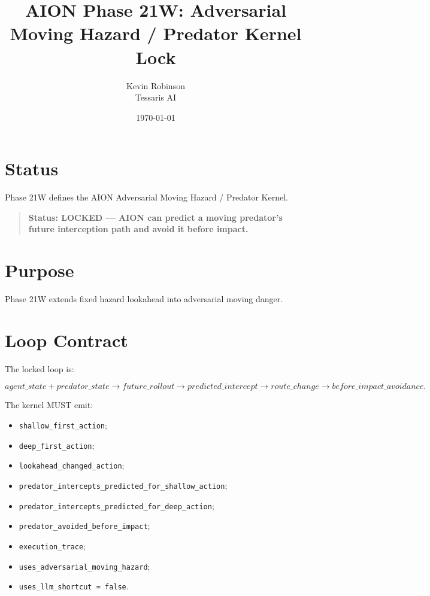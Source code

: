 \documentclass[11pt,a4paper]{article}
\title{\textbf{AION Phase 21W: Adversarial Moving Hazard / Predator Kernel Lock}}
\author{Kevin Robinson\\Tessaris AI}
\date{\today}
\begin{document}
\maketitle

\section{Status}

Phase 21W defines the AION Adversarial Moving Hazard / Predator Kernel.

\begin{quote}
\textbf{Status: LOCKED --- AION can predict a moving predator's future interception path and avoid it before impact.}
\end{quote}

\section{Purpose}

Phase 21W extends fixed hazard lookahead into adversarial moving danger.

\section{Loop Contract}

The locked loop is:

\[
agent\_state + predator\_state
\rightarrow future\_rollout
\rightarrow predicted\_intercept
\rightarrow route\_change
\rightarrow before\_impact\_avoidance.
\]

The kernel MUST emit:

\begin{itemize}
  \item \texttt{shallow\_first\_action};
  \item \texttt{deep\_first\_action};
  \item \texttt{lookahead\_changed\_action};
  \item \texttt{predator\_intercepts\_predicted\_for\_shallow\_action};
  \item \texttt{predator\_intercepts\_predicted\_for\_deep\_action};
  \item \texttt{predator\_avoided\_before\_impact};
  \item \texttt{execution\_trace};
  \item \texttt{uses\_adversarial\_moving\_hazard};
  \item \texttt{uses\_llm\_shortcut = false}.
\end{itemize}
\end{document}
